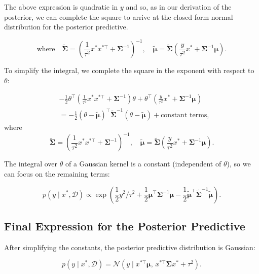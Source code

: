 The above expression is quadratic in $y$ and so, as in our derivation of the posterior, we can complete the square to arrive at the closed form normal distribution for the posterior predictive.

\[
    \text{where} \quad \boldsymbol{\tilde{\Sigma}} = \left( \frac{1}{\tau^{2}} x^{*} x^{*\top} + \boldsymbol{\Sigma}^{-1} \right)^{-1}, \quad \boldsymbol{\tilde{\mu}} = \boldsymbol{\tilde{\Sigma}} \left( \frac{y}{\tau^{2}} x^{*} + \boldsymbol{\Sigma}^{-1} \boldsymbol{\mu} \right).
\]

To simplify the integral, we complete the square in the exponent with respect to \(\theta\):

\[
    \begin{aligned}
         & -\frac{1}{2} \theta^{\top} \left( \frac{1}{\tau^{2}} x^{*} x^{*\top} + \boldsymbol{\Sigma}^{-1} \right) \theta + \theta^{\top} \left( \frac{y}{\tau^{2}} x^{*} + \boldsymbol{\Sigma}^{-1} \boldsymbol{\mu} \right) \\
         & = -\frac{1}{2} \left( \theta - \boldsymbol{\tilde{\mu}} \right)^{\top} \boldsymbol{\tilde{\Sigma}}^{-1} \left( \theta - \boldsymbol{\tilde{\mu}} \right) + \text{constant terms},
    \end{aligned}
\]
where
\[
    \boldsymbol{\tilde{\Sigma}} = \left( \frac{1}{\tau^{2}} x^{*} x^{*\top} + \boldsymbol{\Sigma}^{-1} \right)^{-1}, \quad \boldsymbol{\tilde{\mu}} = \boldsymbol{\tilde{\Sigma}} \left( \frac{y}{\tau^{2}} x^{*} + \boldsymbol{\Sigma}^{-1} \boldsymbol{\mu} \right).
\]

The integral over \(\theta\) of a Gaussian kernel is a constant (independent of \(\theta\)), so we can focus on the remaining terms:

\[
    p(y \mid x^{*}, \mathcal{D}) \propto \exp\left( \frac{1}{2} y^{2} / \tau^{2} + \frac{1}{2} \boldsymbol{\mu}^{\top} \boldsymbol{\Sigma}^{-1} \boldsymbol{\mu} - \frac{1}{2} \boldsymbol{\tilde{\mu}}^{\top} \boldsymbol{\tilde{\Sigma}}^{-1} \boldsymbol{\tilde{\mu}} \right).
\]

\subsection{Final Expression for the Posterior Predictive}

After simplifying the constants, the posterior predictive distribution is Gaussian:

\[
    p(y \mid x^{*}, \mathcal{D}) = \mathcal{N}\left( y \mid x^{*\top} \boldsymbol{\mu}, \, x^{*\top} \boldsymbol{\Sigma} x^{*} + \tau^{2} \right).
\]

